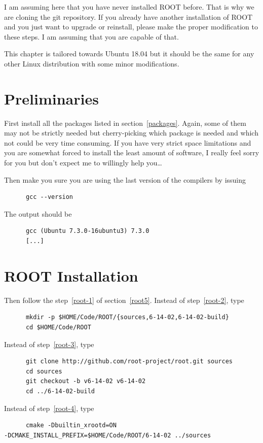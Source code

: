 I am assuming here that you have never installed ROOT before. That is
why we are cloning the git repository. If you already have another
installation of ROOT and you just want to upgrade or reinstall, please
make the proper modification to these steps. I am assuming that you
are capable of that.

This chapter is tailored towards Ubuntu 18.04 but it should be the
same for any other Linux distribution with some minor modifications.

\section{Preliminaries} First install all the packages listed in
section~\ref{packages}. Again, some of them may not be strictly needed
but cherry-picking which package is needed and which not could be very
time consuming. If you have very strict space limitations and you are
somewhat forced to install the least amount of software, I really feel
sorry for you but don't expect me to willingly help you\dots

Then make you sure you are using the last version of the compilers by
issuing
\begin{lstlisting}
      gcc --version
\end{lstlisting}
The output should be
\begin{lstlisting}
      gcc (Ubuntu 7.3.0-16ubuntu3) 7.3.0
      [...]
\end{lstlisting}

\section{ROOT Installation}

Then follow the step~\ref{root-1} of section~\ref{root5}. Instead of step~\ref{root-2}, type
\begin{lstlisting}
      mkdir -p $HOME/Code/ROOT/{sources,6-14-02,6-14-02-build}
      cd $HOME/Code/ROOT
\end{lstlisting}
Instead of step~\ref{root-3}, type
\begin{lstlisting}
      git clone http://github.com/root-project/root.git sources
      cd sources
      git checkout -b v6-14-02 v6-14-02
      cd ../6-14-02-build
\end{lstlisting}
Instead of step~\ref{root-4}, type
\begin{lstlisting}
      cmake -Dbuiltin_xrootd=ON
-DCMAKE_INSTALL_PREFIX=$HOME/Code/ROOT/6-14-02 ../sources
\end{lstlisting}

